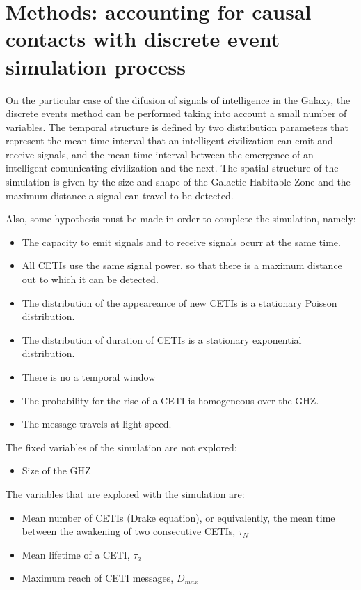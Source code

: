 \documentclass[useAMS,usenatbib]{mnras}
\begin{document}
\section{Methods: accounting for causal contacts with 
discrete event simulation process}

On the particular case of the difusion of signals of intelligence in
the Galaxy, the discrete events method can be performed taking into
account a small number of variables.  The temporal structure is
defined by two distribution parameters that represent the mean
time interval that an intelligent civilization can emit and receive
signals, and the mean time interval between the emergence of an
intelligent comunicating civilization and the next.
The spatial structure of the simulation is given by the size and shape
of the Galactic Habitable Zone and the maximum distance a signal can
travel to be detected.

Also, some hypothesis must be made in order to complete the
simulation, namely:

\begin{itemize}
   \item The capacity to emit signals and to receive signals ocurr at
      the same time.
   \item All CETIs use the same signal power, so that there is a
      maximum distance out to which it can be detected.
   \item The distribution of the appeareance of new CETIs
      is a stationary Poisson distribution.
   \item The distribution of duration of CETIs
      is a stationary exponential distribution.
   \item There is no a temporal window 
   \item The probability for the rise of a CETI is homogeneous
      over the GHZ.
   \item The message travels at light speed.

\end{itemize}


The fixed variables of the simulation are not explored:


\begin{itemize}
   \item Size of the GHZ
\end{itemize}


The variables that are explored with the simulation are:

\begin{itemize}
   \item Mean number of CETIs (Drake equation), or equivalently, the
      mean time between the awakening of two consecutive CETIs,
      $\tau_N$
   \item Mean lifetime of a CETI, $\tau_a$
   \item Maximum reach of CETI messages, $D_{max}$
\end{itemize}
\end{document}
